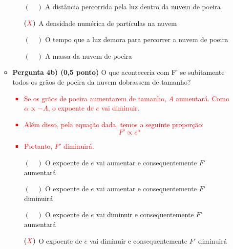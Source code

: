 \documentclass[a4paper, 12pt]{article}
\newcommand{\red}[1]{\textcolor{red}{#1}}
\begin{document}
\begin{flushleft}
\begin{itemize}
\begin{itemize}
                        \begin{itemize}
                            \item[$(\quad)$] A distância percorrida pela luz dentro da nuvem de poeira
                            \item[$(\red{X})$] A densidade numérica de partículas na nuvem
                            \item[$(\quad)$] O tempo que a luz demora para percorrer a nuvem de poeira
                            \item[$(\quad)$] A massa da nuvem de poeira
                        \end{itemize}
                    \item \textbf{Pergunta 4b) (0,5 ponto)} O que aconteceria com F' se subitamente todos os grãos de poeira da nuvem dobrassem de tamanho?
                        \red{\begin{itemize}
                            \item Se os grãos de poeira aumentarem de tamanho, $A$ aumentará. Como $\alpha \propto - A$, o expoente de $e$ vai diminuir.
                            \item Além disso, pela equação dada, temos a seguinte proporção:
                                \begin{equation*}
                                    F' \propto e^\alpha
                                \end{equation*}
                            \item Portanto, $F'$ diminuirá.
                        \end{itemize}}
                        \begin{itemize}
                            \item[$(\quad)$] O expoente de $e$ vai aumentar e consequentemente $F'$ aumentará
                            \item[$(\quad)$] O expoente de $e$ vai aumentar e consequentemente $F'$ diminuirá
                            \item[$(\quad)$] O expoente de $e$ vai diminuir e consequentemente $F'$ aumentará
                            \item[$(\red{X})$] O expoente de $e$ vai diminuir e consequentemente $F'$ diminuirá
                        \end{itemize}
                \end{itemize}


\end{itemize}
\end{flushleft}
\end{document}
